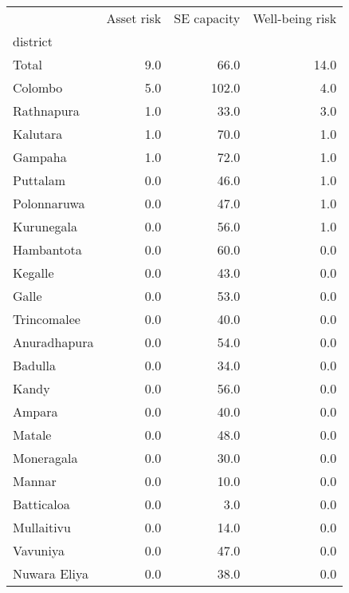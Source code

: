 \begin{tabular}{lrrr}
\toprule
{} &  Asset risk &  SE capacity &  Well-being risk \\
district     &             &              &                  \\
\midrule
Total        &         9.0 &         66.0 &             14.0 \\
Colombo      &         5.0 &        102.0 &              4.0 \\
Rathnapura   &         1.0 &         33.0 &              3.0 \\
Kalutara     &         1.0 &         70.0 &              1.0 \\
Gampaha      &         1.0 &         72.0 &              1.0 \\
Puttalam     &         0.0 &         46.0 &              1.0 \\
Polonnaruwa  &         0.0 &         47.0 &              1.0 \\
Kurunegala   &         0.0 &         56.0 &              1.0 \\
Hambantota   &         0.0 &         60.0 &              0.0 \\
Kegalle      &         0.0 &         43.0 &              0.0 \\
Galle        &         0.0 &         53.0 &              0.0 \\
Trincomalee  &         0.0 &         40.0 &              0.0 \\
Anuradhapura &         0.0 &         54.0 &              0.0 \\
Badulla      &         0.0 &         34.0 &              0.0 \\
Kandy        &         0.0 &         56.0 &              0.0 \\
Ampara       &         0.0 &         40.0 &              0.0 \\
Matale       &         0.0 &         48.0 &              0.0 \\
Moneragala   &         0.0 &         30.0 &              0.0 \\
Mannar       &         0.0 &         10.0 &              0.0 \\
Batticaloa   &         0.0 &          3.0 &              0.0 \\
Mullaitivu   &         0.0 &         14.0 &              0.0 \\
Vavuniya     &         0.0 &         47.0 &              0.0 \\
Nuwara Eliya &         0.0 &         38.0 &              0.0 \\
\bottomrule
\end{tabular}
